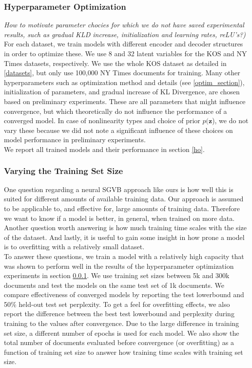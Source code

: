 \documentclass{report}
\begin{document}
	\subsubsection{Hyperparameter Optimization}\label{HO_section}
	\textit{How to motivate parameter chocies for which we do not have saved experimental results, such as gradual KLD increase, initialization and learning rates, reLU's?)}
	For each dataset, we train models with different encoder and decoder structures in order to optimize these. We use 8 and 32 latent variables for the KOS and NY Times datasets, respectively. We use the whole KOS dataset as detailed in \ref{datasets}, but only use 100,000 NY Times documents for training. Many other hyperparameters such as optimization method and details (see \ref{optim_section}), initialization of parameters, and gradual increase of KL Divergence, are chosen based on preliminary experiments. These are all parameters that might influence convergence, but which theoretically do not influence the performance of a converged model. In case of nonlinearity types and choice of prior $p(\mathbf{z}$), we do not vary these because we did not note a significant influence of these choices on model performance in preliminary experiments.\\
	We report all trained models and their performance in section \ref{ho}.
	
	
	\subsubsection{Varying the Training Set Size}
	One question regarding a neural SGVB approach like ours is how well this is suited for different amounts of available training data. Our approach is assumed to be applicable to, and effective for,  large amounts of training data. Therefore we want to know if a model is better, in general, when trained on more data. Another question worth answering is how much training time scales with the size of the dataset. And lastly, it is useful to gain some insight in how prone a model is to overfitting with a relatively small dataset.\\
	To answer these questions, we train a model with a relatively high capacity that was shown to perform well in the results of the hyperparameter optimization experiments in section \ref{HO_section}. We use training set sizes between 5k and 300k documents and test the models on the same test set of 1k documents. We compare effectiveness of converged models by reporting the test lowerbound and 50\% held-out test set perplexity. To get a feel for overfitting effects, we also report the difference between the best test lowerbound and perplexity during training to the values after convergence. Due to the large difference in training set size, a different number of epochs is used for each model. We also show the total number of documents evaluated before convergence (or overfitting) as a function of training set size to answer how training time scales with training set size.
		
\end{document}
